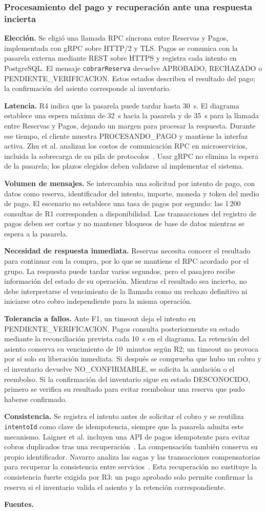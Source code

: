 \documentclass[11pt,a4paper]{article}
\newcommand{\decision}[8]{\subsubsection*{#1}%
  \textbf{Elección.} #2\par
  \textbf{Latencia.} #3\par
  \textbf{Volumen de mensajes.} #4\par
  \textbf{Necesidad de respuesta inmediata.} #5\par
  \textbf{Tolerancia a fallos.} #6\par
  \textbf{Consistencia.} #7\par
  \textbf{Fuentes.} #8\par}
\begin{document}
\decision{Procesamiento del pago y recuperación ante una respuesta incierta}
{Se eligió una llamada RPC síncrona entre Reservas y Pagos,
implementada con gRPC sobre HTTP/2 y TLS. Pagos se comunica con
la pasarela externa mediante REST sobre HTTPS y registra cada
intento en PostgreSQL. El mensaje \texttt{cobrarReserva} devuelve
APROBADO, RECHAZADO o PENDIENTE\_VERIFICACION. Estos estados
describen el resultado del pago; la confirmación del asiento
corresponde al inventario.}
{R4 indica que la pasarela puede tardar hasta 30~s. El diagrama
establece una espera máxima de 32~s hacia la pasarela y de 35~s
para la llamada entre Reservas y Pagos, dejando un margen para
procesar la respuesta. Durante ese tiempo, el cliente muestra
PROCESANDO\_PAGO y mantiene la interfaz activa. Zhu et al.
analizan los costos de comunicación RPC en microservicios,
incluida la sobrecarga de su pila de
protocolos~\cite{zhu2025}. Usar gRPC no elimina la
espera de la pasarela; los plazos elegidos deben validarse al
implementar el sistema.}
{Se intercambia una solicitud por intento de pago, con datos
como reserva, identificador del intento, importe, moneda y
token del medio de pago. El escenario no establece una tasa
de pagos por segundo: las 1\,200 consultas de R1 corresponden
a disponibilidad. Las transacciones del registro de pagos
deben ser cortas y no mantener bloqueos de base de datos
mientras se espera a la pasarela.}
{Reservas necesita conocer el resultado para continuar con
la compra, por lo que se mantiene el RPC acordado por el
grupo. La respuesta puede tardar varios segundos, pero el
pasajero recibe información del estado de su operación.
Mientras el resultado sea incierto, no debe interpretarse
el vencimiento de la llamada como un rechazo definitivo
ni iniciarse otro cobro independiente para la misma operación.}
{Ante F1, un timeout deja el intento en
PENDIENTE\_VERIFICACION. Pagos consulta posteriormente su
estado mediante la reconciliación prevista cada 10~s en el
diagrama. La retención del asiento conserva su vencimiento
de 10~minutos según R2; un timeout no provoca por sí solo
su liberación inmediata. Si después se comprueba que hubo
un cobro y el inventario devuelve NO\_CONFIRMABLE, se solicita
la anulación o el reembolso. Si la confirmación del inventario
sigue en estado DESCONOCIDO, primero se verifica su resultado
para evitar reembolsar una reserva que pudo haberse confirmado.}
{Se registra el intento antes de solicitar el cobro y se
reutiliza \texttt{intentoId} como clave de idempotencia,
siempre que la pasarela admita este mecanismo. Laigner et al.
incluyen una API de pagos idempotente para evitar cobros
duplicados tras una recuperación~\cite{laigner2025}.
La compensación también conserva su propio identificador.
Navarro analiza las sagas y las transacciones compensatorias
para recuperar la consistencia entre
servicios~\cite{navarro2025}. Esta recuperación
no sustituye la consistencia fuerte exigida por R3: un pago
aprobado solo permite confirmar la reserva si el inventario
valida el asiento y la retención correspondiente.}
{\cite{zhu2025,laigner2025,navarro2025}}
\end{document}
